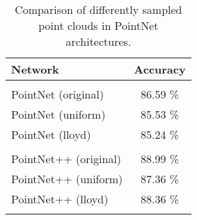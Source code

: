 \begin{table}[]
	\centering
	\begin{tabular}{lc}
		\hline
		\textbf{Network}      & Accuracy \\ \hline
		                      &          \\
		PointNet (original)   & 86.59 \% \\
		PointNet (uniform)    & 85.53 \% \\
		PointNet (lloyd)      & 85.24 \% \\
		                      &          \\
		PointNet++ (original) & 88.99 \%  \\
		PointNet++ (uniform)  & 87.36 \%  \\
		PointNet++ (lloyd)    & 88.36 \% \\
		                      &          \\ \hline
	\end{tabular}
\caption{Comparison of differently sampled point clouds in PointNet architectures.}
\label{Table:pn}
\end{table}